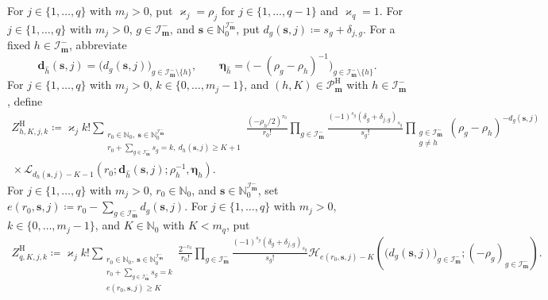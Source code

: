 \documentclass[10pt]{amsart}
\newcommand{\Nzero}{\mathbb N_0}
\newcommand{\mm}{\boldsymbol m}
\theoremstyle{plain}
\theoremstyle{definition}
\theoremstyle{remark}
\begin{document}
For \(j\in\{1,\ldots,q\}\) with \(m_j>0\), put
\(\varkappa_j=\rho_j\) for \(j\in\{1,\ldots,q-1\}\) and
\(\varkappa_q=1\).
For \(j\in\{1,\ldots,q\}\) with \(m_j>0\),
\(g\in\mathcal I_{\mm}^-\), and
\(\boldsymbol s\in\mathbb N_0^{\mathcal I_{\mm}^-}\), put
\(d_g(\boldsymbol s,j)\coloneq s_g+\delta_{j,g}\). For a fixed
\(h\in\mathcal I_{\mm}^-\), abbreviate
\[
 \boldsymbol d_{\widehat h}(\boldsymbol s,j)
 =\bigl(d_g(\boldsymbol s,j)\bigr)_{
   g\in\mathcal I_{\mm}^-\setminus\{h\}},\qquad
 \boldsymbol\eta_{\widehat h}
 =\bigl(-(\rho_g-\rho_h)^{-1}\bigr)_{
   g\in\mathcal I_{\mm}^-\setminus\{h\}}.
\]
For
\(j\in\{1,\ldots,q\}\) with \(m_j>0\),
\(k\in\{0,\ldots,m_j-1\}\), and
\((h,K)\in\mathscr P_{\mm}^{\mathrm H}\) with
\(h\in\mathcal I_{\mm}^-\), define
\begin{multline}
 Z_{h,K,j,k}^{\mathrm H}
 \coloneq\varkappa_j k!
 \sum_{\substack{r_0\in\Nzero,\ 
                  \boldsymbol s\in\mathbb N_0^{\mathcal I_{\mm}^-}\\
                  r_0+\sum_{g\in\mathcal I_{\mm}^-}s_g=k,\ 
                  d_h(\boldsymbol s,j)\ge K+1}}
 \frac{(-\rho_h/2)^{r_0}}{r_0!}
 \prod_{g\in\mathcal I_{\mm}^-}
 \frac{(-1)^{s_g}(\delta_g+\delta_{j,g})_{s_g}}{s_g!}
 \prod_{\substack{g\in\mathcal I_{\mm}^-\\g\ne h}}
 (\rho_g-\rho_h)^{-d_g(\boldsymbol s,j)}
 \\
 {}\times
 \mathscr L_{d_h(\boldsymbol s,j)-K-1}
 \left(
 r_0;\boldsymbol d_{\widehat h}(\boldsymbol s,j);
 \rho_h^{-1},\boldsymbol\eta_{\widehat h}
 \right).
 \label{eq:Hermite-explicit-connection-finite}
\end{multline}
For \(j\in\{1,\ldots,q\}\) with \(m_j>0\), \(r_0\in\Nzero\), and
\(\boldsymbol s\in\mathbb N_0^{\mathcal I_{\mm}^-}\), set
\(e(r_0,\boldsymbol s,j)\coloneq
r_0-\sum_{g\in\mathcal I_{\mm}^-}d_g(\boldsymbol s,j)\).
For \(j\in\{1,\ldots,q\}\) with \(m_j>0\),
\(k\in\{0,\ldots,m_j-1\}\), and
\(K\in\Nzero\) with \(K<m_q\), put
\begin{multline}
 Z_{q,K,j,k}^{\mathrm H}
 \coloneq\varkappa_j k!
 \sum_{\substack{r_0\in\Nzero,\ 
                  \boldsymbol s\in\mathbb N_0^{\mathcal I_{\mm}^-}\\
                  r_0+\sum_{g\in\mathcal I_{\mm}^-}s_g=k\\
                  e(r_0,\boldsymbol s,j)\ge K}}
 \frac{2^{-r_0}}{r_0!}
 \prod_{g\in\mathcal I_{\mm}^-}
 \frac{(-1)^{s_g}(\delta_g+\delta_{j,g})_{s_g}}{s_g!}
 \mathscr H_{e(r_0,\boldsymbol s,j)-K}
 \left(
 \bigl(d_g(\boldsymbol s,j)\bigr)_{g\in\mathcal I_{\mm}^-};
 (-\rho_g)_{g\in\mathcal I_{\mm}^-}
 \right).
 \label{eq:Hermite-explicit-connection-infinity}
\end{multline}
\end{document}
